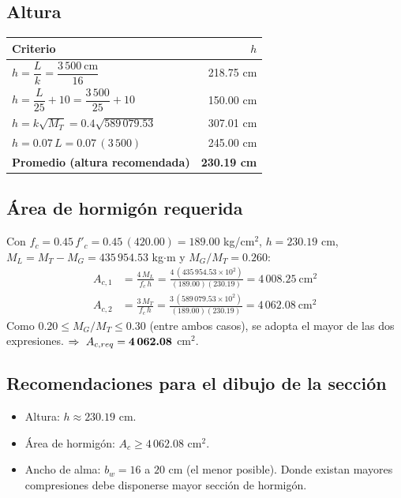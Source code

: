 \documentclass[11pt,a4paper]{article}
\begin{document}
\subsection{Altura}
\begin{center}
\renewcommand{\arraystretch}{1.9}
\begin{tabular}{lr}
\toprule
Criterio & $h$ \\
\midrule
$h = \dfrac{L}{k} = \dfrac{3\,500\ \text{cm}}{16}$ & 218.75 cm \\
$h = \dfrac{L}{25} + 10 = \dfrac{3\,500}{25} + 10$ & 150.00 cm \\
$h = k\sqrt{M_T} = 0.4\sqrt{589\,079.53}$ & 307.01 cm \\
$h = 0.07\,L = 0.07\,(3\,500)$ & 245.00 cm \\
\midrule
\textbf{Promedio (altura recomendada)} & \textbf{230.19 cm} \\
\bottomrule
\end{tabular}
\end{center}


\subsection{Área de hormigón requerida}
Con $f_c = 0.45\,f'_c = 0.45\,(420.00) = 189.00$ kg/cm$^2$, $h = 230.19$ cm, $M_L = M_T - M_G = 435\,954.53$ kg$\cdot$m
y $M_G/M_T = 0.260$:
\begin{align*}
A_{c,1} &= \frac{4\,M_L}{f_c\,h} = \frac{4\,(435\,954.53\times10^2)}{(189.00)(230.19)} = 4\,008.25\ \text{cm}^2 \\
A_{c,2} &= \frac{3\,M_T}{f_c\,h} = \frac{3\,(589\,079.53\times10^2)}{(189.00)(230.19)} = 4\,062.08\ \text{cm}^2
\end{align*}
Como $0.20 \le M_G/M_T \le 0.30$ (entre ambos casos), se adopta el mayor de las dos expresiones. \quad $\Rightarrow\ A_{c,req} = \textbf{4\,062.08}$ cm$^2$.

\subsection{Recomendaciones para el dibujo de la sección}
\begin{itemize}
\item Altura: $h \approx 230.19$ cm.
\item Área de hormigón: $A_c \ge 4\,062.08$ cm$^2$.
\item Ancho de alma: $b_w = 16$ a $20$ cm (el menor posible). Donde existan mayores compresiones debe disponerse mayor sección de hormigón.
\end{itemize}
\end{document}
